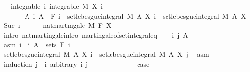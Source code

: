 \begin{isabellebody}
\ \ \ integrable{\isacharcolon}{\kern0pt}\ {\isachardoublequoteopen}{\isasymAnd}i{\isachardot}{\kern0pt}\ integrable\ M\ {\isacharparenleft}{\kern0pt}X\ i{\isacharparenright}{\kern0pt}{\isachardoublequoteclose}\isanewline
\ \ \ \ \ \ \ {\isachardoublequoteopen}{\isasymAnd}A\ i{\isachardot}{\kern0pt}\ A\ {\isasymin}\ F\ i\ {\isasymLongrightarrow}\ set{\isacharunderscore}{\kern0pt}lebesgue{\isacharunderscore}{\kern0pt}integral\ M\ A\ {\isacharparenleft}{\kern0pt}X\ i{\isacharparenright}{\kern0pt}\ {\isacharequal}{\kern0pt}\ set{\isacharunderscore}{\kern0pt}lebesgue{\isacharunderscore}{\kern0pt}integral\ M\ A\ {\isacharparenleft}{\kern0pt}X\ {\isacharparenleft}{\kern0pt}Suc\ i{\isacharparenright}{\kern0pt}{\isacharparenright}{\kern0pt}{\isachardoublequoteclose}\ \isanewline
\ \ \ \ \ {\isachardoublequoteopen}nat{\isacharunderscore}{\kern0pt}martingale\ M\ F\ X{\isachardoublequoteclose}\isanewline
%
\isadelimproof
%
\endisadelimproof
%
\isatagproof
{}\isamarkupfalse%
\ {\isacharparenleft}{\kern0pt}intro\ nat{\isacharunderscore}{\kern0pt}martingale{\isachardot}{\kern0pt}intro\ martingale{\isacharunderscore}{\kern0pt}of{\isacharunderscore}{\kern0pt}set{\isacharunderscore}{\kern0pt}integral{\isacharunderscore}{\kern0pt}eq{\isacharparenright}{\kern0pt}\isanewline
\ \ \isamarkupfalse%
\ i\ j\ A\ \isamarkupfalse%
\ asm{\isacharcolon}{\kern0pt}\ {\isachardoublequoteopen}i\ {\isasymle}\ j{\isachardoublequoteclose}\ {\isachardoublequoteopen}A\ {\isasymin}\ sets\ {\isacharparenleft}{\kern0pt}F\ i{\isacharparenright}{\kern0pt}{\isachardoublequoteclose}\isanewline
\ \ \isamarkupfalse%
\ {\isachardoublequoteopen}set{\isacharunderscore}{\kern0pt}lebesgue{\isacharunderscore}{\kern0pt}integral\ M\ A\ {\isacharparenleft}{\kern0pt}X\ i{\isacharparenright}{\kern0pt}\ {\isacharequal}{\kern0pt}\ set{\isacharunderscore}{\kern0pt}lebesgue{\isacharunderscore}{\kern0pt}integral\ M\ A\ {\isacharparenleft}{\kern0pt}X\ j{\isacharparenright}{\kern0pt}{\isachardoublequoteclose}\ \isamarkupfalse%
\ asm\isanewline
\ \ \isamarkupfalse%
\ {\isacharparenleft}{\kern0pt}induction\ {\isachardoublequoteopen}j\ {\isacharminus}{\kern0pt}\ i{\isachardoublequoteclose}\ arbitrary{\isacharcolon}{\kern0pt}\ i\ j{\isacharparenright}{\kern0pt}\isanewline
\ \ \ \ \isamarkupfalse%
\ {}\isanewline
\ \ \ \ \isamarkupfalse%
\ \isamarkupfalse%
\ {\isacharquery}{\kern0pt}case\ \isamarkupfalse%

\end{isabellebody}
